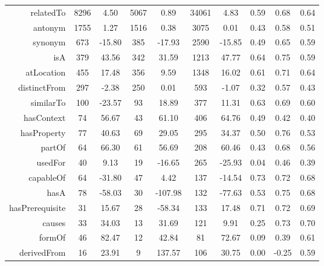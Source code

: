 \documentclass[letterpaper]{article} %
\begin{document}
\begin{table}[ht]
\begin{tabular}{@{}r|cc|cc|cc|ccc@{}}
 relatedTo         & 	8296      & 	4.50     &	5067    & 	0.89    & 	34061     & 	4.83       & 	0.59 & 	0.68 & 	0.64 \\
antonym           & 	1755      & 	1.27     &	1516    & 	0.38    & 	3075      & 	0.01       & 	0.43 & 	0.58 & 	0.51 \\
synonym           & 	673       & 	-15.80   &	385     & 	-17.93  & 	2590      & 	-15.85     & 	0.49 & 	0.65 & 	0.59 \\
isA               & 	379       & 	43.56    &	342     & 	31.59   & 	1213       & 	47.77      & 	0.64 & 	0.75 & 	0.59 \\
atLocation        & 	455       & 	17.48    &	356     & 	9.59    & 	1348       & 	16.02      & 	0.61 & 	0.71 & 	0.64 \\
distinctFrom      & 	297       & 	-2.38    &	250     & 	0.01    & 	593       & 	-1.07      & 	0.32 & 	0.57 & 	0.43 \\
similarTo         & 	100       & 	-23.57   &	93      & 	18.89   & 	377       & 	11.31      & 	0.63 & 	0.69 & 	0.60 \\
hasContext        & 	74        & 	56.67    &	43      & 	61.10   & 	406       & 	64.76      & 	0.49 & 	0.42 & 	0.40 \\
hasProperty       & 	77        & 	40.63    &	69      & 	29.05   & 	295       & 	34.37      & 	0.50 & 	0.76 & 	0.53 \\
partOf            & 	64        & 	66.30    &	61      & 	56.69   & 	208       & 	60.46      & 	0.43 & 	0.68 & 	0.56 \\
usedFor           & 	40        & 	9.13     &	19      & 	-16.65  & 	265       & 	-25.93     & 	0.04 & 	0.46 & 	0.39 \\
capableOf         & 	64        & 	-31.80   &	47      & 	4.42    & 	137       & 	-14.54     & 	0.73 & 	0.72 & 	0.68 \\
hasA              & 	78        & 	-58.03   &	30      & 	-107.98 & 	132        & 	-77.63     & 	0.53 & 	0.75 & 	0.68 \\
hasPrerequisite   & 	31        & 	15.67    &	28      & 	-58.34  & 	133        & 	17.48      & 	0.71 & 	0.72 & 	0.69 \\
causes            & 	33        & 	34.03    &	13      & 	31.69   & 	121        & 	9.91       & 	0.25 & 	0.73 & 	0.70 \\
formOf            & 	46        & 	82.47    &	12      & 	42.84   & 	81        & 	72.67      & 	0.09 & 	0.39 & 	0.61 \\
derivedFrom       & 	16        & 	23.91    &	9       & 	137.57  & 	106        & 	30.75      & 	0.00 & 	-0.25 & 	0.59 \\

\end{tabular}
\end{table}
\end{document}
